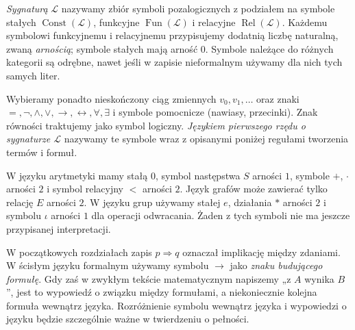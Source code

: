 \begin{definicja}\label{def:syntax-signature}
\emph{Sygnaturą} $\mathcal L$ nazywamy zbiór symboli pozalogicznych
z podziałem na symbole stałych $\operatorname{Const}(\mathcal L)$,
funkcyjne $\operatorname{Fun}(\mathcal L)$ i relacyjne
$\operatorname{Rel}(\mathcal L)$. Każdemu symbolowi funkcyjnemu i relacyjnemu
przypisujemy dodatnią liczbę naturalną, zwaną \emph{arnością};
symbole stałych mają arność $0$.
Symbole należące do różnych kategorii są odrębne, nawet jeśli w zapisie
nieformalnym używamy dla nich tych samych liter.
\end{definicja}
Wybieramy ponadto nieskończony ciąg zmiennych $v_0,v_1,\ldots$ oraz znaki
$=,\neg,\land,\lor,\to,\leftrightarrow,\forall,\exists$ i symbole pomocnicze
(nawiasy, przecinki). Znak równości traktujemy jako symbol logiczny.
\emph{Językiem pierwszego rzędu o sygnaturze $\mathcal L$} nazywamy te
symbole wraz z opisanymi poniżej regułami tworzenia termów i formuł.

\begin{przyklad}\label{ex:syntax-signatures}
W języku arytmetyki mamy stałą $0$, symbol następstwa $S$ arności $1$,
symbole $+$, $\cdot$ arności $2$ i symbol relacyjny $<$ arności $2$.
Język grafów może zawierać tylko relację $E$ arności $2$.
W języku grup używamy stałej $e$, działania $\ast$ arności $2$
i symbolu $\iota$ arności $1$ dla operacji odwracania.
Żaden z tych symboli nie ma jeszcze przypisanej interpretacji.
\end{przyklad}


\begin{uwaga}
W początkowych rozdziałach zapis $p\Rightarrow q$ oznaczał
implikację między zdaniami. W ścisłym języku formalnym używamy
symbolu $\to$ jako \emph{znaku budującego formułę}.
Gdy zaś w zwykłym tekście matematycznym napiszemy
„z $A$ wynika $B$”, jest to wypowiedź o związku między formułami,
a niekoniecznie kolejna formuła wewnątrz języka.
Rozróżnienie symbolu wewnątrz języka i wypowiedzi o języku
będzie szczególnie ważne w twierdzeniu o pełności.
\end{uwaga}

